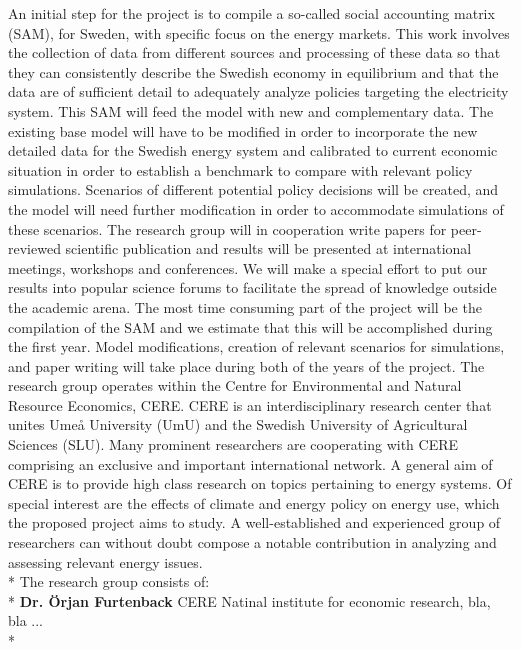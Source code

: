 \documentclass[10pt,a4paper]{article}
\begin{document}
An initial step for the project is to compile a so-called social accounting matrix (SAM), for Sweden, with specific focus on the energy markets. This work involves the collection of data from different sources and processing of these data so that they can consistently describe the Swedish economy in equilibrium and that the data are of sufficient detail to adequately analyze policies targeting the electricity system. This SAM will feed the model with new and complementary data.
The existing base model will have to be modified in order to incorporate the new detailed data for the Swedish energy system and calibrated to current economic situation in order to establish a benchmark to compare with relevant policy simulations. Scenarios of different potential policy decisions will be created, and the model will need further modification in order to accommodate simulations of these scenarios.
The research group will in cooperation write papers for peer-reviewed scientific publication and results will be presented at international meetings, workshops and conferences. We will make a special effort to put our results into popular science forums to facilitate the spread of knowledge outside the academic arena.
The most time consuming part of the project will be the compilation of the SAM and we estimate that this will be accomplished during the first year. Model modifications, creation of relevant scenarios for simulations, and paper writing will take place during both of the years of the project.
The research group operates within the Centre for Environmental and Natural Resource Economics, CERE. CERE is an interdisciplinary research center that unites Umeå University (UmU) and the Swedish University of Agricultural Sciences (SLU). Many prominent researchers are cooperating with CERE comprising an exclusive and important international network. A general aim of CERE is to provide high class research on topics pertaining to energy systems. Of special interest are the effects of climate and energy policy on energy use, which the proposed project aims to study. A well-established and experienced group of researchers can without doubt compose a notable contribution in analyzing and assessing relevant energy issues.\\*
The research group consists of:\\*
\textbf{Dr. Örjan Furtenback} CERE Natinal institute for economic research, bla, bla ...\\*
\end{document}
